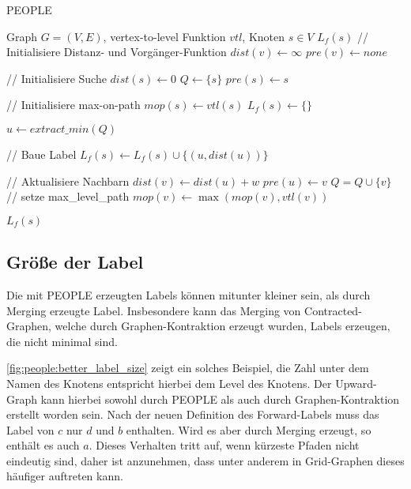\begin{algorithm}[p]
  \caption{PEOPLE}
  \begin{algorithmic}[1]
    \Require Graph $G = (V, E)$, vertex-to-level Funktion ${vtl}$, Knoten $s \in V$
    \Ensure $L_f (s)$
    \State // Initialisiere Distanz- und Vorgänger-Funktion
    \State ${dist}(v) \leftarrow \infty$
    \State ${pre}(v) \leftarrow {none}$
    \EndFor

    \State
    \State // Initialisiere Suche
    \State ${dist}(s) \leftarrow 0$
    \State $Q\leftarrow \{ s \}$
    \State ${pre}(s) \leftarrow s$

    \State
    \State // Initialisiere max-on-path
    \State ${mop}(s) \leftarrow {vtl}(s)$
    \State $L_f (s) \leftarrow \{ \}$

    \State
    \State $u \leftarrow{extract\_min}(Q)$

    \State
    \State // Baue Label
    \State $L_f (s) \leftarrow L_f (s) \cup \{ (u, {dist}(u)) \}$
    \EndIf

    \State
    \State // Aktualisiere Nachbarn
    \State ${dist}(v) \leftarrow {dist}(u) + w$
    \State ${pre}(u) \leftarrow v$
    \State $Q = Q \cup \{ v \}$
    \State
    \State // setze max\_level\_path
    \State ${mop}(v) \leftarrow \max({mop}(v), {vtl}(v))$
    \EndIf
    \EndFor

    \EndWhile

    \State
    \State \Return $L_f (s)$
  \end{algorithmic}
  \label{alg:people:people}
\end{algorithm}

\subsection{Größe der Label}\label{subsection:people:label_size}

Die mit PEOPLE erzeugten Labels können mitunter kleiner sein, als durch Merging erzeugte Label.
Insbesondere kann das Merging von Contracted-Graphen, welche durch Graphen-Kontraktion erzeugt wurden, Labels erzeugen, die nicht minimal sind.

\autoref{fig:people:better_label_size} zeigt ein solches Beispiel, die Zahl unter dem Namen des Knotens entspricht hierbei dem Level des Knotens.
Der Upward-Graph kann hierbei sowohl durch PEOPLE als auch durch Graphen-Kontraktion erstellt worden sein.
Nach der neuen Definition des Forward-Labels muss das Label von $c$ nur $d$ und $b$ enthalten.
Wird es aber durch Merging erzeugt, so enthält es auch $a$.
Dieses Verhalten tritt auf, wenn kürzeste Pfaden nicht eindeutig sind, daher ist anzunehmen, dass unter anderem in Grid-Graphen dieses häufiger auftreten kann.


